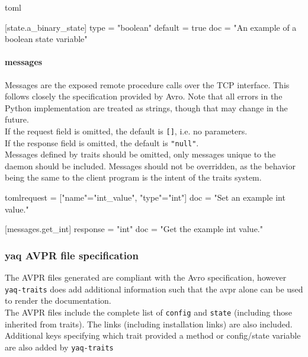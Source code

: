 \begin{codefragment}{toml}\noop
[state]

[state.a_binary_state]
type = "boolean"
default = true
doc = "An example of a boolean state variable"
\end{codefragment}

\hypertarget{messages}{%
\paragraph{messages}\label{messages}}

Messages are the exposed remote procedure calls over the TCP interface.
This follows closely the specification
provided by Avro\cite{avro_message}. Note that all errors in the Python implementation are treated
as strings, though that may change in the future.\\
If the request field is omitted, the default is \texttt{{[}{]}}, i.e. no
parameters.\\
If the response field is omitted, the default is \texttt{"null"}.\\
Messages defined by traits should be omitted, only messages unique to
the daemon should be included. Messages should not be overridden, as the
behavior being the same to the client program is the intent of the
traits system.

\begin{codefragment}{toml}
request = [{"name"="int_value", "type"="int"}]
doc = "Set an example int value."

[messages.get_int] response = "int"
doc = "Get the example int value."
\end{codefragment}

\hypertarget{yaq-avpr-file-specification}{%
\subsubsection{yaq AVPR file
specification}\label{yaq-avpr-file-specification}}

The AVPR files generated are compliant with the
Avro specification\cite{avpr}, however \texttt{yaq-traits} does add additional
information such that the avpr alone can be used to render the
documentation.\\
The AVPR files include the complete list of \texttt{config} and
\texttt{state} (including those inherited from traits). The links
(including installation links) are also included. Additional keys
specifying which trait provided a method or config/state variable are
also added by \texttt{yaq-traits}


